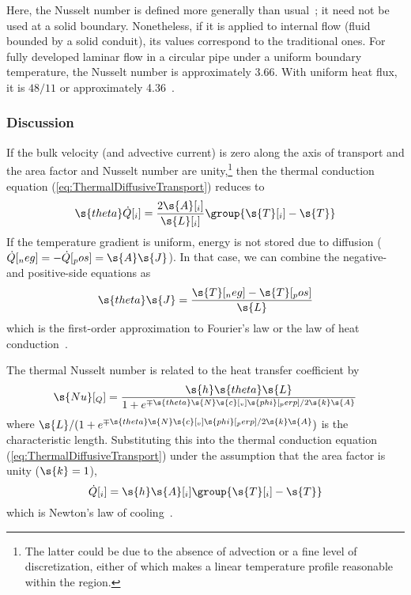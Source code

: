 Here, the Nusselt number is defined more generally than usual~\cite{Incropera2002}; it need not be used at a solid boundary.  Nonetheless, if it is applied to internal flow (fluid bounded by a solid conduit), its values correspond to the traditional ones.  For fully developed laminar flow in a circular pipe under a uniform boundary temperature, the Nusselt number is approximately 3.66.  With uniform heat flux, it is $48/11$ or approximately 4.36~\cite{Incropera2002}.



\subsubsection{Discussion}

If the bulk velocity (and advective current) is zero along the axis of transport and the area factor and Nusselt number are unity,\footnote{The latter could be due to the absence of advection or a fine level of discretization, either of which makes a linear temperature profile reasonable within the region.} then the thermal conduction equation (\ref{eq:ThermalDiffusiveTransport}) reduces to
\begin{equation}
  \s{theta}\dot{Q}[_i] = \frac{2\s{A}[_i]}{\s{L}[_i]}\group{\s{T}[_i] - \s{T}}
\end{equation}
If the temperature gradient is uniform, energy is not stored due to diffusion ($\dot{Q}[_neg] = -\dot{Q}[_pos] = \s{A}\s{J}$).  In that case, we can combine the negative- and positive-side equations as\label{mark:Fourier}
\begin{equation}
  \s{theta}\s{J} = \frac{\s{T}[_neg] - \s{T}[_pos]}{\s{L}}
\end{equation}
which is the first-order approximation to Fourier's law or the law of heat conduction~\cite{Incropera2002, Wesselingh2000}.%

The thermal Nusselt number is related to the heat transfer coefficient by
\begin{equation}
  \s{Nu}[_Q] = \frac{\s{h}\s{theta}\s{L}}{1 + e^{\mp\s{theta}\s{N}\s{c}[_v]\s{phi}[_perp]/2\s{k}\s{A}}}
\end{equation}
where $\s{L}/(1 + e^{\mp\s{theta}\s{N}\s{c}[_v]\s{phi}[_perp]/2\s{k}\s{A}})$ is the characteristic length.  Substituting this into the thermal conduction equation (\ref{eq:ThermalDiffusiveTransport}) under the assumption that the area factor is unity ($\s{k} = 1$)\label{mark:Newton},
\begin{equation}
  \dot{Q}[_i] = \s{h}\s{A}[_i]\group{\s{T}[_i] - \s{T}}
\end{equation}
which is Newton's law of cooling~\cite{Incropera2002}.


